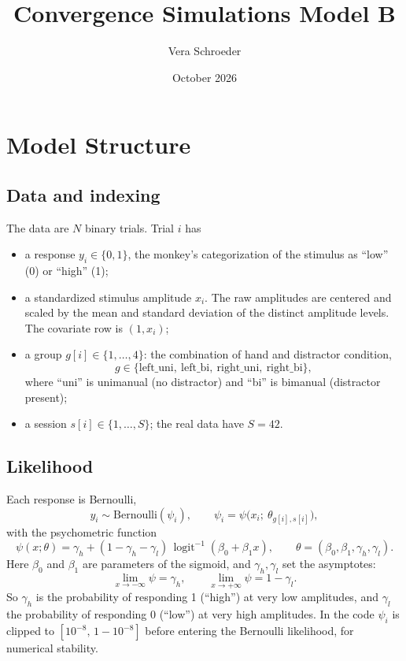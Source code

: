 \documentclass[11pt]{article}
\title{Convergence Simulations Model B}
\author{Vera Schroeder}
\date{October 2026}
\newcommand{\invlogit}{\operatorname{logit}^{-1}}
\begin{document}
\maketitle


\section{Model Structure}
\subsection{Data and indexing}
The data are $N$ binary trials. Trial $i$ has
\begin{itemize}
  \item a response $y_i \in \{0,1\}$, the monkey's categorization of the stimulus as ``low'' (0) or ``high'' (1);
  \item a standardized stimulus amplitude $x_i$. The raw amplitudes are centered and scaled by the mean and standard deviation of the distinct amplitude levels. The covariate row is
        $(1, x_i)$;
  \item a group $g[i] \in \{1,\dots,4\}$: the combination of
        hand and distractor condition,
        \[
          g \in \{\text{left\_uni},\ \text{left\_bi},\ \text{right\_uni},\ \text{right\_bi}\},
        \]
        where ``uni'' is unimanual (no distractor) and ``bi'' is bimanual
        (distractor present);
  \item a session $s[i] \in \{1,\dots,S\}$; the real data have
        $S = 42$.
\end{itemize}

\subsection{Likelihood}


Each response is Bernoulli,
\[
  y_i \sim \text{Bernoulli}(\psi_i), \qquad
  \psi_i = \psi\big(x_i;\ \theta_{g[i],s[i]}\big),
\]
with the psychometric function
\[
  \psi(x;\theta) = \gamma_h + (1 - \gamma_h - \gamma_l)\,\invlogit(\beta_0 + \beta_1 x),
  \qquad \theta = (\beta_0, \beta_1, \gamma_h, \gamma_l).
\]
Here $\beta_0$ and $\beta_1$ are parameters of the sigmoid, and $\gamma_h,\gamma_l$
set the asymptotes:
\[
  \lim_{x\to-\infty}\psi = \gamma_h, \qquad \lim_{x\to+\infty}\psi = 1-\gamma_l .
\]
So $\gamma_h$ is the probability of responding 1 (``high'') at very low amplitudes, and
$\gamma_l$ the probability of responding 0 (``low'') at very high amplitudes. In the code
$\psi_i$ is clipped to $[10^{-8},\,1-10^{-8}]$ before entering the Bernoulli
likelihood, for numerical stability.
\end{document}
